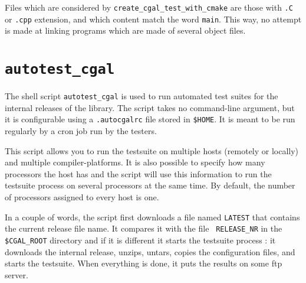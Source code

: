 Files which are considered by {{\tt create\_cgal\_test\_with\_cmake}} are those with
{\tt .C} or {\tt .cpp} extension, and which content match the word {\tt main}.
This way, no attempt is made at linking programs which are made of several
object files.


\section{{\tt autotest\_cgal}}
\label{sec:autotest_cgal}

The shell script {\tt autotest\_cgal} is used to run automated test suites for
the internal releases of the library. The script takes no command-line
argument, but it is configurable using a {\tt .autocgalrc} file stored
in {\tt \$HOME}.
It is meant to be run regularly by a cron job run by the testers.

This script allows you to run the testsuite on multiple hosts (remotely or
locally) and multiple compiler-platforms. It is also possible to specify how
many processors the host has and the script will use this information to run
the testsuite process on several processors at the same time. By default, the
number of processors assigned to every host is one.

In a couple of words, the script first downloads a file named {\tt LATEST}
that contains the current release file name. It compares it with the file {\tt
RELEASE\_NR} in the {\tt \$CGAL\_ROOT} directory and if it is different it
starts the testsuite process : it downloads the internal release, unzips,
untars, copies the configuration files, and starts the testsuite. When
everything is done, it puts the results on some ftp server.

